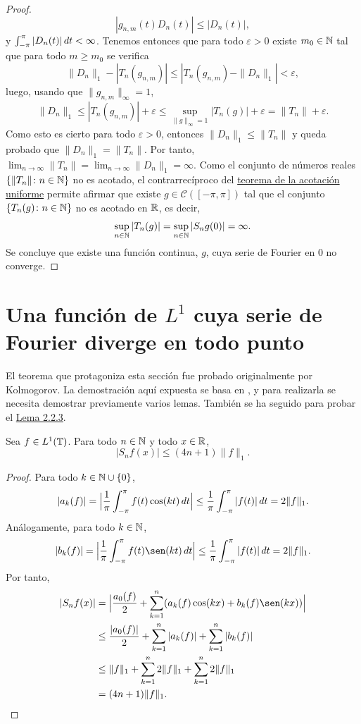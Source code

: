 \documentclass[a4paper, 12pt, oneside]{book}
\begin{document}
\begin{proof}
    \[|g_{n,m}(t) D_n(t)| \leq |D_n(t)|,\]
    y $\int_{-\pi}^{\pi} |D_n(t)| \, dt < \infty$. Tenemos entonces que para todo $\varepsilon >0$ existe $m_0 \in \mathbb N$ tal que para todo $m \geq m_0$ se verifica
    \[\|D_n\|_1 - |T_n(g_{n,m})| \leq  |T_n(g_{n,m}) - \|D_n\|_1| < \varepsilon,\]
    luego, usando que $\|g_{n,m}\|_\infty = 1$,
    \[\|D_n\|_1 \leq |T_n(g_{n,m})| + \varepsilon \leq \sup_{\|g\|_\infty = 1} |T_n(g)| + \varepsilon = \|T_n\| + \varepsilon.\]
    Como esto es cierto para todo $\varepsilon > 0$, entonces $\|D_n\|_1 \leq \|T_n\|$ y queda probado que $\|D_n\|_1 = \|T_n\|$. Por tanto, $\lim_{n \to \infty} \|T_n\| = \lim_{n \to \infty} \|D_n\|_1 = \infty$. Como el conjunto de números reales $\{\|T_n\| \colon n \in \mathbb N\}$ no es acotado, el contrarrecíproco del \hyperref[1.2.2]{\color{blue}teorema de la acotación uniforme} permite afirmar que existe $g \in \mathcal{C}([-\pi,\pi])$ tal que el conjunto $\{T_n(g) \colon n \in \mathbb N\}$ no es acotado en $\mathbb R$, es decir,
    \[\sup_{n \in \mathbb N} |T_n(g)| = \sup_{n \in \mathbb N} |S_ng(0)|= \infty.\]
    Se concluye que existe una función continua, $g$, cuya serie de Fourier en $0$ no converge.
\end{proof}

\section[Una función de \texorpdfstring{$L^1$}{L1} cuya serie de Fourier diverge en todo punto]{Una función de \texorpdfstring{\boldmath$L^1$}{L1} cuya serie de Fourier diverge en todo punto}

El teorema que protagoniza esta sección fue probado originalmente por Kolmogorov. La demostración aquí expuesta se basa en \cite{zygmund}, y para realizarla se necesita demostrar previamente varios lemas. También se ha seguido \cite{schmidt} para probar el \hyperref[]{\color{blue}Lema 2.2.3}.

\begin{lemma}\label{2.2.1}
    Sea $f \in L^1(\mathbb T)$. Para todo $n \in \mathbb N$ y todo $x \in \mathbb R$,
    \[|S_nf(x)| \leq (4n+1)\|f\|_{1}.\]
\end{lemma}

\begin{proof}
    Para todo $k \in \mathbb N \cup \{0\}$,
    \[|a_k(f)| = \Bigl|\frac{1}{\pi}\int_{-\pi}^{\pi} f(t)\cos(kt) \, dt\Bigr| \leq \frac{1}{\pi}\int_{-\pi}^{\pi} |f(t)| \, dt = 2\|f\|_{1}.\]
    Análogamente, para todo $k \in \mathbb N$,
    \[|b_k(f)| = \Bigl|\frac{1}{\pi}\integral{-\pi}{\pi}{f(t)\sen(kt)}\Bigr| \leq \frac{1}{\pi}\integral{-\pi}{\pi}{|f(t)|} = 2\|f\|_{1}.\]
    Por tanto,
    \begin{align*}
        |S_nf(x)| &= \Bigl|\frac{a_0(f)}{2}+\sum_{k=1}^n (a_k(f)\cos(kx)+b_k(f)\sen(kx))\Bigr| \\
        &\leq \frac{|a_0(f)|}{2}+\sum_{k=1}^n|a_k(f)|+\sum_{k=1}^n|b_k(f)| \\
        &\leq \|f\|_{1}+\sum_{k=1}^n2\|f\|_{1}+\sum_{k=1}^n 2\|f\|_{1} \\
        &=(4n+1)\|f\|_{1}. \qedhere
    \end{align*}
\end{proof}
\end{document}

